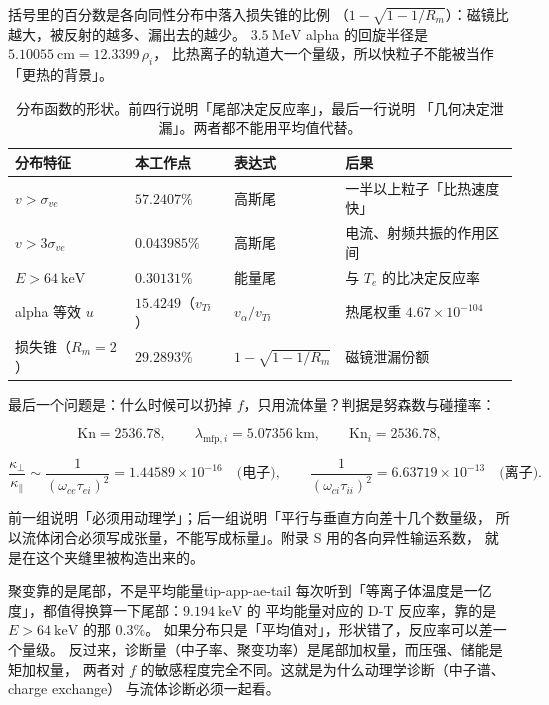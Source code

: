 括号里的百分数是各向同性分布中落入损失锥的比例
（$1-\sqrt{1-1/R_m}$）：磁镜比越大，被反射的越多、漏出去的越少。
$3.5\ \mathrm{MeV}$ alpha 的回旋半径是 $5.10055\ \mathrm{cm}=12.3399\,\rho_i$，
比热离子的轨道大一个量级，所以快粒子不能被当作「更热的背景」。

\begin{table}[htbp]
\centering
\small
\caption{分布函数的形状。前四行说明「尾部决定反应率」，最后一行说明
「几何决定泄漏」。两者都不能用平均值代替。}
\label{tab:app-ae-velocity}
\begin{tabular}{p{3.4cm}p{3.2cm}p{3.0cm}p{4.2cm}}
\toprule
分布特征 & 本工作点 & 表达式 & 后果 \\
\midrule
$v>\sigma_{ve}$ & $57.2407\%$ & 高斯尾 & 一半以上粒子「比热速度快」 \\
$v>3\sigma_{ve}$ & $0.043985\%$ & 高斯尾 & 电流、射频共振的作用区间 \\
$E>64\ \mathrm{keV}$ & $0.30131\%$ & 能量尾 & 与 $T_e$ 的比决定反应率 \\
alpha 等效 $u$ & $15.4249$（$v_{Ti}$） & $v_\alpha/v_{Ti}$ & 热尾权重 $4.67\times10^{-104}$ \\
损失锥（$R_m=2$） & $29.2893\%$ & $1-\sqrt{1-1/R_m}$ & 磁镜泄漏份额 \\
\bottomrule
\end{tabular}

\end{table}

最后一个问题是：什么时候可以扔掉 $f$，只用流体量？判据是努森数与碰撞率：

\begin{equation}
\mathrm{Kn}=2536.78,\qquad
\lambda_{\mathrm{mfp},i}=5.07356\ \mathrm{km},\qquad
\mathrm{Kn}_i=2536.78 ,
\label{eq:app-ae-closure}
\end{equation}

\begin{equation}
\frac{\kappa_\perp}{\kappa_\parallel}\sim\frac{1}{\left(\omega_{ce}\tau_{ei}\right)^{2}}
=1.44589\times10^{-16}\quad\text{(电子)},\qquad
\frac{1}{\left(\omega_{ci}\tau_{ii}\right)^{2}}=6.63719\times10^{-13}\quad\text{(离子)} .
\label{eq:app-ae-anisotropy}
\end{equation}

前一组说明「必须用动理学」；后一组说明「平行与垂直方向差十几个数量级，
所以流体闭合必须写成张量，不能写成标量」。附录 S 用的各向异性输运系数，
就是在这个夹缝里被构造出来的。

\begin{tip}{聚变靠的是尾部，不是平均能量}{tip-app-ae-tail}
每次听到「等离子体温度是一亿度」，都值得换算一下尾部：$9.194\ \mathrm{keV}$ 的
平均能量对应的 D-T 反应率，靠的是 $E>64\ \mathrm{keV}$ 的那 $0.3\%$。
如果分布只是「平均值对」，形状错了，反应率可以差一个量级。
反过来，诊断量（中子率、聚变功率）是尾部加权量，而压强、储能是矩加权量，
两者对 $f$ 的敏感程度完全不同。这就是为什么动理学诊断（中子谱、charge exchange）
与流体诊断必须一起看。
\end{tip}

